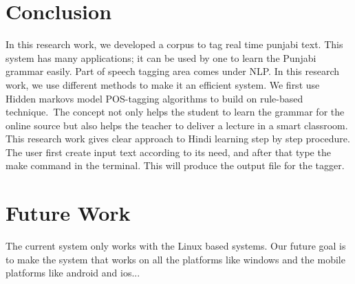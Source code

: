 \documentclass[12pt,a4paper,oneside]{memoir}
\begin{document}
\section{Conclusion}
In this research work, we developed a corpus to tag real time punjabi text. This system has many applications; it can be used by one to learn the Punjabi grammar easily. Part of speech tagging area comes under NLP. In this research work, we use different methods to make it an efficient system. We first use Hidden markovs model POS-tagging algorithms to build on rule-based technique. The concept not only helps the student to learn the grammar for the online source but also helps the teacher to deliver a lecture in a smart classroom. This research work gives clear approach to Hindi learning step by step procedure. The user first create input text according to its need, and after that type the make command in the terminal. This will produce the output file for the tagger.

\section{Future Work}

The current system only works with the Linux based systems. Our future goal is to make the system that works on all the platforms like windows and the mobile platforms like android and ios...














%
%



\begin{thebibliography}{9}



\end{thebibliography}
\end{document}
